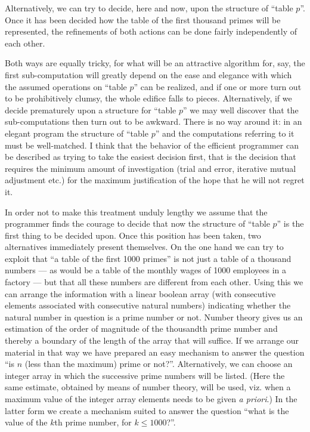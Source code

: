 Alternatively, we can try to decide, here and now, upon the structure of ``table $p$''. Once it has been decided how the table of the first thousand primes will be represented, the refinements of both actions can be done fairly independently of each other.

Both ways are equally tricky, for what will be an attractive algorithm for, say, the first sub-computation will greatly depend on the ease and elegance with which the assumed operations on ``table $p$'' can be realized, and if one or more turn out to be prohibitively clumsy, the whole edifice falls to pieces. Alternatively, if we decide prematurely upon a structure for ``table $p$'' we may well discover that the sub-computations then turn out to be awkward. There is no way around it: in an elegant program the structure of ``table $p$'' and the computations referring to it must be well-matched. I think that the behavior of the efficient programmer can be described as trying to take the easiest decision first, that is the decision that requires the minimum amount of investigation (trial and error, iterative mutual adjustment etc.) for the maximum justification of the hope that he will not regret it.

In order not to make this treatment unduly lengthy we assume that the programmer finds the courage to decide that now the structure of ``table $p$'' is the first thing to be decided upon. Once this position has been taken, two alternatives immediately present themselves. On the one hand we can try to exploit that ``a table of the first 1000 primes'' is not just a table of a thousand numbers --- as would be a table of the monthly wages of 1000 employees in a factory --- but that all these numbers are different from each other. Using this we can arrange the information with a linear boolean array (with consecutive elements associated with consecutive natural numbers) indicating whether the natural number in question is a prime number or not. Number theory gives us an estimation of the order of magnitude of the thousandth prime number and thereby a boundary of the length of the array that will suffice. If we arrange our material in that way we have prepared an easy mechanism to answer the question ``is $n$ (less than the maximum) prime or not?''. Alternatively, we can choose an integer array in which the successive prime numbers will be listed. (Here the same estimate, obtained by means of number theory, will be used, viz. when a maximum value of the integer array elements needs to be given \textit{a priori}.) In the latter form we create a mechanism suited to answer the question ``what is the value of the $k$th prime number, for $k \leqslant 1000$?''.

